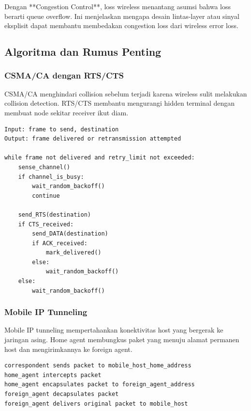 Dengan **Congestion Control**, loss wireless menantang asumsi bahwa loss berarti queue overflow. Ini menjelaskan mengapa desain lintas-layer atau sinyal eksplisit dapat membantu membedakan congestion loss dari wireless error loss.

\subsection{Algoritma dan Rumus Penting}

\subsubsection{CSMA/CA dengan RTS/CTS}
\begin{jawab}
CSMA/CA menghindari collision sebelum terjadi karena wireless sulit melakukan collision detection. RTS/CTS membantu mengurangi hidden terminal dengan membuat node sekitar receiver ikut diam.
\end{jawab}

\begin{lstlisting}[caption={Pseudocode CSMA/CA dengan RTS/CTS}, label={lst:csmaca}]
Input: frame to send, destination
Output: frame delivered or retransmission attempted

while frame not delivered and retry_limit not exceeded:
    sense_channel()
    if channel_is_busy:
        wait_random_backoff()
        continue

    send_RTS(destination)
    if CTS_received:
        send_DATA(destination)
        if ACK_received:
            mark_delivered()
        else:
            wait_random_backoff()
    else:
        wait_random_backoff()
\end{lstlisting}

\subsubsection{Mobile IP Tunneling}
\begin{jawab}
Mobile IP tunneling mempertahankan konektivitas host yang bergerak ke jaringan asing. Home agent membungkus paket yang menuju alamat permanen host dan mengirimkannya ke foreign agent.
\end{jawab}

\begin{lstlisting}[caption={Pseudocode Mobile IP tunneling}, label={lst:mobile-ip}]
correspondent sends packet to mobile_host_home_address
home_agent intercepts packet
home_agent encapsulates packet to foreign_agent_address
foreign_agent decapsulates packet
foreign_agent delivers original packet to mobile_host
\end{lstlisting}

